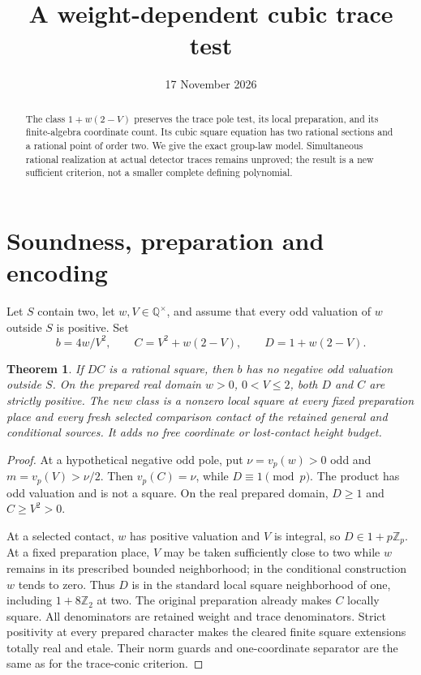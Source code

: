 \documentclass[11pt,a4paper]{article}
\title{A weight-dependent cubic trace test}
\author{}\date{17 November 2026}
\newtheorem{theorem}{Theorem}[section]
\newcommand{\Q}{\mathbb Q}
\begin{document}
\maketitle
\begin{abstract}
The class $1+w(2-V)$ preserves the trace pole test, its local preparation,
and its finite-algebra coordinate count. Its cubic square equation has
two rational sections and a rational point of order two. We give the
exact group-law model. Simultaneous rational realization at actual
detector traces remains unproved; the result is a new sufficient
criterion, not a smaller complete defining polynomial.
\end{abstract}

\section{Soundness, preparation and encoding}
Let $S$ contain two, let $w,V\in\Q^\times$, and assume that every
odd valuation of $w$ outside $S$ is positive. Set
\[
 b=4w/V^2,\qquad C=V^2+w(2-V),\qquad D=1+w(2-V).
\]
\begin{theorem}
If $DC$ is a rational square, then $b$ has no negative odd valuation
outside $S$. On the prepared real domain $w>0$, $0<V\le2$, both
$D$ and $C$ are strictly positive. The new class is a nonzero local
square at every fixed preparation place and every fresh selected
comparison contact of the retained general and conditional sources.
It adds no free coordinate or lost-contact height budget.
\end{theorem}
\begin{proof}
At a hypothetical negative odd pole, put $\nu=v_p(w)>0$ odd and
$m=v_p(V)>\nu/2$. Then $v_p(C)=\nu$, while
$D\equiv1\pmod p$. The product has odd valuation and is not a
square. On the real prepared domain, $D\ge1$ and $C\ge V^2>0$.

At a selected contact, $w$ has positive valuation and $V$ is integral,
so $D\in1+p\mathbb Z_p$. At a fixed preparation place, $V$ may be
taken sufficiently close to two while $w$ remains in its prescribed
bounded neighborhood; in the conditional construction $w$ tends to
zero. Thus $D$ is in the standard local square neighborhood of one,
including $1+8\mathbb Z_2$ at two. The original preparation already
makes $C$ locally square. All denominators are retained weight and
trace denominators. Strict positivity at every prepared character
makes the cleared finite square extensions totally real and etale.
Their norm guards and one-coordinate separator are the same as for
the trace-conic criterion.
\end{proof}
\end{document}
